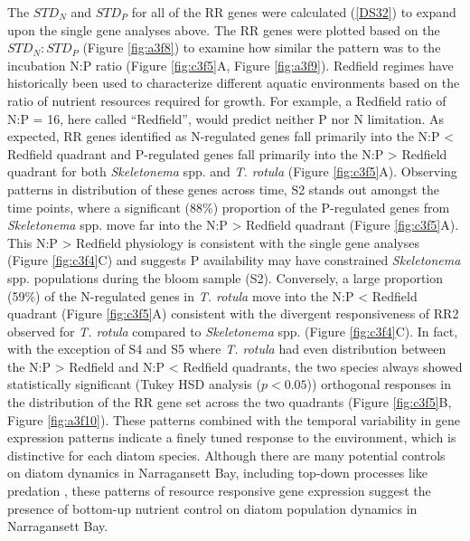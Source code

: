 The $STD_N$ and $STD_P$ for all of the RR genes were calculated (\ref{DS32}) to expand upon the single gene analyses above. The RR genes were plotted based on the $STD_N : STD_P$ (Figure \ref{fig:a3f8}) to examine how similar the pattern was to the incubation N:P ratio (Figure \ref{fig:c3f5}A, Figure \ref{fig:a3f9}). Redfield regimes have historically been used to characterize different aquatic environments based on the ratio of nutrient resources required for growth. For example, a Redfield ratio of N:P = 16, here called “Redfield”, would predict neither P nor N limitation. As expected, RR genes identified as N-regulated genes fall primarily into the N:P < Redfield quadrant and P-regulated genes fall primarily into the N:P > Redfield quadrant for both \textit{Skeletonema} spp. and \textit{T. rotula} (Figure \ref{fig:c3f5}A). Observing patterns in distribution of these genes across time, S2 stands out amongst the time points, where a significant (88\%) proportion of the P-regulated genes from \textit{Skeletonema} spp. move far into the N:P > Redfield quadrant (Figure \ref{fig:c3f5}A). This N:P > Redfield physiology is consistent with the single gene analyses (Figure \ref{fig:c3f4}C) and suggests P availability may have constrained \textit{Skeletonema} spp. populations during the bloom sample (S2). Conversely, a large proportion (59\%) of the N-regulated genes in \textit{T. rotula} move into the N:P < Redfield quadrant (Figure \ref{fig:c3f5}A) consistent with the divergent responsiveness of RR2 observed for \textit{T. rotula} compared to \textit{Skeletonema} spp. (Figure \ref{fig:c3f4}C). In fact, with the exception of S4 and S5 where \textit{T. rotula} had even distribution between the N:P > Redfield and N:P < Redfield quadrants, the two species always showed statistically significant (Tukey HSD analysis ($p<0.05$)) orthogonal responses in the distribution of the RR gene set across the two quadrants (Figure \ref{fig:c3f5}B, Figure \ref{fig:a3f10}). These patterns combined with the temporal variability in gene expression patterns indicate a finely tuned response to the environment, which is distinctive for each diatom species. Although there are many potential controls on diatom dynamics in Narragansett Bay, including top-down processes like predation \citep{Martin1970, Lawerence2012}, these patterns of resource responsive gene expression suggest the presence of bottom-up nutrient control on diatom population dynamics in Narragansett Bay.\par

